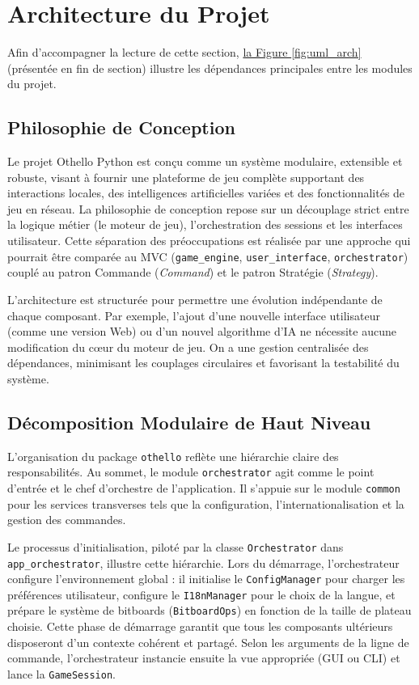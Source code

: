 \documentclass[a4paper]{article}
\begin{document}
\section{Architecture du Projet}

Afin d'accompagner la lecture de cette section, \hyperref[fig:uml_arch]{la Figure \ref*{fig:uml_arch}} (présentée en fin de section) illustre les dépendances principales entre les modules du projet.

\subsection{Philosophie de Conception}

Le projet Othello Python est conçu comme un système modulaire, extensible et robuste, visant à fournir une plateforme de jeu complète supportant des interactions locales, des intelligences artificielles variées et des fonctionnalités de jeu en réseau. La philosophie de conception repose sur un découplage strict entre la logique métier (le moteur de jeu), l'orchestration des sessions et les interfaces utilisateur. Cette séparation des préoccupations est réalisée par une approche qui pourrait être comparée au MVC (\texttt{game\_engine}, \texttt{user\_interface}, \texttt{orchestrator}) couplé au patron Commande (\textit{Command}) et le patron Stratégie (\textit{Strategy}).

L'architecture est structurée pour permettre une évolution indépendante de chaque composant. Par exemple, l'ajout d'une nouvelle interface utilisateur (comme une version Web) ou d'un nouvel algorithme d'IA ne nécessite aucune modification du cœur du moteur de jeu. On a une gestion centralisée des dépendances, minimisant les couplages circulaires et favorisant la testabilité du système.

\subsection{Décomposition Modulaire de Haut Niveau}

L'organisation du package \texttt{othello} reflète une hiérarchie claire des responsabilités. Au sommet, le module \texttt{orchestrator} agit comme le point d'entrée et le chef d'orchestre de l'application. Il s'appuie sur le module \texttt{common} pour les services transverses tels que la configuration, l'internationalisation et la gestion des commandes.

Le processus d'initialisation, piloté par la classe \texttt{Orchestrator} dans \texttt{app\_orchestrator}, illustre cette hiérarchie. Lors du démarrage, l'orchestrateur configure l'environnement global : il initialise le \texttt{ConfigManager} pour charger les préférences utilisateur, configure le \texttt{I18nManager} pour le choix de la langue, et prépare le système de bitboards (\texttt{BitboardOps}) en fonction de la taille de plateau choisie. Cette phase de démarrage garantit que tous les composants ultérieurs disposeront d'un contexte cohérent et partagé. Selon les arguments de la ligne de commande, l'orchestrateur instancie ensuite la vue appropriée (GUI ou CLI) et lance la \texttt{GameSession}.
\end{document}

